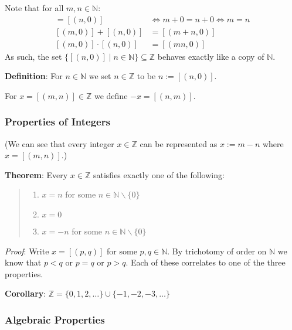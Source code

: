 \documentclass[11pt]{article}
\begin{document}
Note that for all $m,n \in \mathbb{N}$:
\begin{align*}
[(m,0)] = [(n,0)] &\iff m+0 = n+0 \iff m = n\\
[(m,0)] + [(n,0)] &= [(m+n, 0)]\\
[(m,0)] \cdot [(n,0)] &= [(mn, 0)]
\end{align*}
As such, the set $\{[(n,0)] \mid n \in \mathbb{N}\} \subseteq \mathbb{Z}$ behaves exactly like a copy of $\mathbb{N}$.

\textbf{Definition}: For $n \in \mathbb{N}$ we set $n \in \mathbb{Z}$ to be $n := [(n,0)]$.

\hspace{2cm}For $x = [(m,n)] \in \mathbb{Z}$ we define $-x = [(n,m)]$.

\subsubsection{Properties of Integers}

(We can see that every integer $x \in \mathbb{Z}$ can be represented as $x := m - n$ where $x = [(m,n)]$.)

\textbf{Theorem}: Every $x \in \mathbb{Z}$ satisfies exactly one of the following:
\begin{quote}\vspace{-0.3cm}
	\begin{enumerate}
	\item $x = n$ for some $n \in \mathbb{N} \backslash \{0\}$
	\item $x = 0$
	\item $x = -n$ for some $n \in \mathbb{N} \backslash \{0\}$
	\end{enumerate}
\end{quote}
\emph{Proof}: Write $x = [(p,q)]$ for some $p,q \in \mathbb{N}$. By trichotomy of order on $\mathbb{N}$ we know that $p < q$ or $p = q$ or $p > q$. Each of these correlates to one of the three properties.

\textbf{Corollary}: $\mathbb{Z} = \{0,1,2, \ldots \} \cup \{-1, -2, -3, \ldots \}$

\subsubsection{Algebraic Properties}
\end{document}
